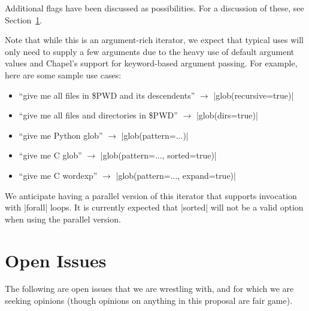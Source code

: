 \documentclass{article}
\begin{document}
Additional flags have been discussed as possibilities. For a discussion
of these, see Section~\ref{s:open_issues}.

Note that while this is an argument-rich iterator, we expect that
typical uses will only need to supply a few arguments due to the heavy
use of default argument values and Chapel's support for keyword-based
argument passing.  For example, here are some sample use cases:

\begin{itemize}
\item ``give me all files in \$PWD and its descendents'' $\to$ |glob(recursive=true)|
\item ``give me all files and directories in \$PWD'' $\to$ |glob(dirs=true)|
\item ``give me Python glob'' $\to$ |glob(pattern=...)|
\item ``give me C glob'' $\to$ |glob(pattern=..., sorted=true)|
\item ``give me C wordexp'' $\to$ |glob(pattern=..., expand=true)|
\end{itemize}

We anticipate having a parallel version of this iterator that supports
invocation with |forall| loops.  It is currently expected that
|sorted| will not be a valid option when using the parallel version.


\section{Open Issues}\label{s:open_issues}
The following are open issues that we are wrestling with, and for
which we are seeking opinions (though opinions on anything in this
proposal are fair game).
\end{document}
